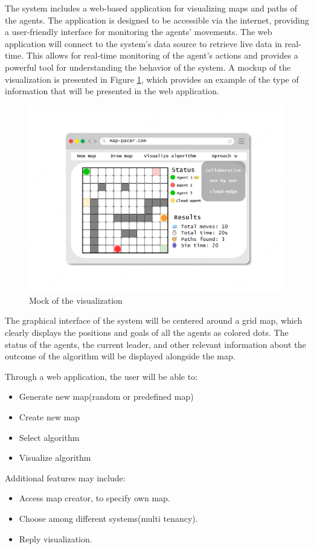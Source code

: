 The system includes a web-based application for visualizing maps and paths of the agents. The application is designed to be accessible via the internet, providing a user-friendly interface for monitoring the agents' movements. The web application will connect to the system's data source to retrieve live data in real-time. This allows for real-time monitoring of the agent's actions and provides a powerful tool for understanding the behavior of the system. A mockup of the visualization is presented in Figure \ref{fig:vis_mock}, which provides an example of the type of information that will be presented in the web application. 

\begin{figure}[H]
    \centering
    \includegraphics[width=\textwidth]{pictures/frontenf_mock.png}
    \caption{ Mock of the visualization }
    \label{fig:vis_mock}
\end{figure}

The graphical interface of the system will be centered around a grid map, which clearly displays the positions and goals of all the agents as colored dots. The status of the agents, the current leader, and other relevant information about the outcome of the algorithm will be displayed alongside the map.

Through a web application, the user will be able to:
\begin{itemize}
\itemsep0em 
    \item Generate new map(random or predefined map)
    \item Create new map
    \item Select algorithm
    \item Visualize algorithm
\end{itemize}
Additional features may include:
\begin{itemize}
\itemsep0em 
    \item Access map creator, to specify own map.
    \item Choose among different systems(multi tenancy).
    \item Reply visualization.
\end{itemize}